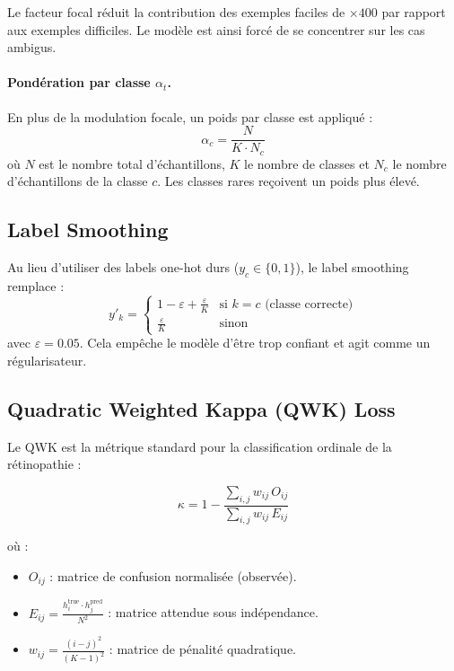 \documentclass[11pt,a4paper]{article}
\begin{document}
Le facteur focal réduit la contribution des exemples faciles de $\times 400$ par rapport aux exemples difficiles. Le modèle est ainsi forcé de se concentrer sur les cas ambigus.

\paragraph{Pondération par classe $\alpha_t$.}
En plus de la modulation focale, un poids par classe est appliqué :
\begin{equation}
  \alpha_c = \frac{N}{K \cdot N_c}
\end{equation}
où $N$ est le nombre total d'échantillons, $K$ le nombre de classes et $N_c$ le nombre d'échantillons de la classe $c$. Les classes rares reçoivent un poids plus élevé.

\subsection{Label Smoothing}

Au lieu d'utiliser des labels one-hot durs ($y_c \in \{0, 1\}$), le label smoothing remplace :
\begin{equation}
  y'_k = \begin{cases}
    1 - \varepsilon + \frac{\varepsilon}{K} & \text{si } k = c \text{ (classe correcte)} \\[4pt]
    \frac{\varepsilon}{K} & \text{sinon}
  \end{cases}
\end{equation}
avec $\varepsilon = 0.05$. Cela empêche le modèle d'être trop confiant et agit comme un régularisateur.

\subsection{Quadratic Weighted Kappa (QWK) Loss}

Le QWK est la métrique standard pour la classification ordinale de la rétinopathie :

\begin{equation}
  \kappa = 1 - \frac{\sum_{i,j} w_{ij}\,O_{ij}}{\sum_{i,j} w_{ij}\,E_{ij}}
\end{equation}

où :
\begin{itemize}[leftmargin=2em]
  \item $O_{ij}$ : matrice de confusion normalisée (observée).
  \item $E_{ij} = \frac{h_i^{\text{true}} \cdot h_j^{\text{pred}}}{N^2}$ : matrice attendue sous indépendance.
  \item $w_{ij} = \frac{(i-j)^2}{(K-1)^2}$ : matrice de pénalité quadratique.
\end{itemize}
\end{document}
